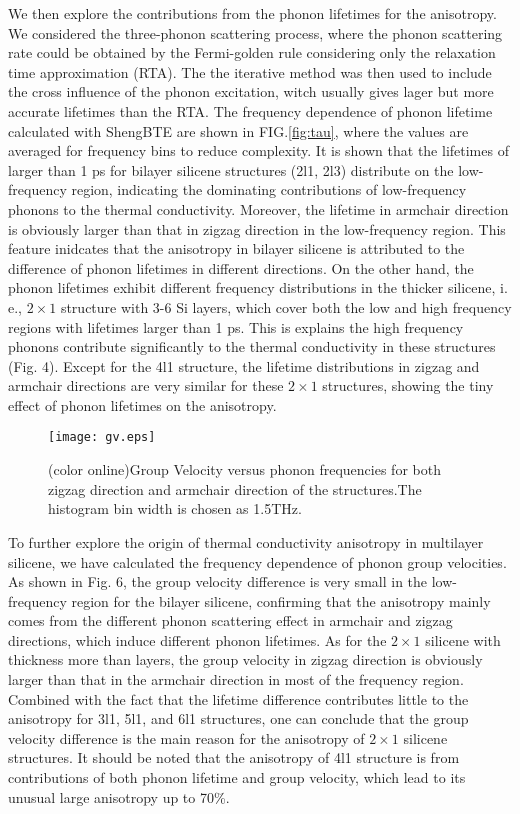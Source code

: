 \documentclass[aps,prb,twocolumn,showpacs,amsmath,amssymb]{revtex4-1}
\begin{document}
We then explore the contributions from the phonon lifetimes for the anisotropy.
We considered the three-phonon scattering process, where the phonon scattering rate could be obtained by the Fermi-golden rule\cite{Li2014} considering only the relaxation time approximation (RTA). The the iterative method was then used to include the cross influence of the phonon excitation, witch usually gives lager but more accurate lifetimes than the RTA. The frequency dependence of phonon lifetime calculated with ShengBTE\cite{Li2014} are shown in FIG.\ref{fig:tau}, where the values are averaged for frequency bins to reduce complexity.  It is shown that the lifetimes of larger than 1 ps for bilayer silicene structures (2l1, 2l3) distribute on the low-frequency region, indicating the dominating contributions of low-frequency phonons to the thermal conductivity. Moreover, the lifetime in armchair direction is obviously larger than that in zigzag direction in the low-frequency region. This feature inidcates that the anisotropy in bilayer silicene is attributed to the difference of phonon lifetimes in different directions. 
On the other hand, the phonon lifetimes exhibit different frequency distributions in the thicker silicene, i. e.,  $2\times1$ structure with 3-6 Si layers, which cover both the low and high frequency regions with lifetimes  larger than 1 ps.  This is explains the high frequency phonons contribute significantly to the thermal conductivity in these structures (Fig. 4).  Except for the 4l1 structure, the lifetime distributions in zigzag and armchair directions are very similar for these  $2\times1$ structures, showing the tiny effect of phonon lifetimes on the anisotropy. 


\begin{figure}[b]
  \texttt{[image: gv.eps]}{}
  \caption{\label{fig:gv} (color online)Group Velocity versus phonon frequencies for both zigzag direction and armchair direction of the structures.The histogram bin width is chosen as 1.5THz.}
\end{figure}

To further explore the origin of thermal conductivity anisotropy in multilayer  silicene, we have calculated the frequency dependence of phonon group velocities. As shown in Fig. 6,  the group velocity  difference is very small in the low-frequency region for the bilayer silicene, confirming that the anisotropy mainly comes from the different phonon scattering effect in armchair and zigzag directions,  which induce different phonon lifetimes. 
As for the $2\times 1$ silicene with thickness more than layers,  the group velocity in zigzag direction is obviously larger than that in the armchair direction in most of the frequency region. Combined with the fact that the lifetime difference contributes little to the anisotropy for 3l1, 5l1, and 6l1 structures, one can conclude that the group velocity difference is the main reason for the anisotropy of $2\times 1$ silicene structures. It should be noted that the anisotropy of 4l1 structure is from contributions of both phonon lifetime and group velocity, which lead to its unusual large anisotropy up to 70\%. 
\end{document}
